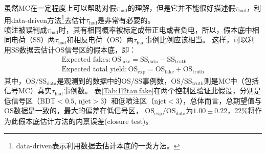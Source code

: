 虽然MC在一定程度上可以帮助对假$\tau_{\text{had}}$的理解，但是它并不能很好描述假$\tau_{\text{had}}$，利用data-driven方法\footnote{data-driven表示利用数据去估计本底的一类方法。}去估计$\tau_{\text{had}}$是非常有必要的。\\
喷注被误判成$\tau_{\text{had}}$时，其有相同概率被标定成带正电或者负电，所以，假本底中相同电荷（SS）两$\tau_{\text{had}}$和相反电荷（OS）两$\tau_{\text{had}}$事例比例应该相当。
这样，可以利用SS数据去估计OS信号区的假本底，即：
\begin{equation}
 \begin{aligned}
  \text{Expected fakes}: \text{OS}_{\text{fake}}=\text{SS}_{\text{data}}-\text{SS}_{\text{truth}}\\
  \text{Expected total yield}: \text{OS}_{\text{exp}}=\text{OS}_{\text{fake}}+\text{OS}_{\text{truth}}
 \end{aligned}
\end{equation}
其中，$\text{OS}/\text{SS}_{\text{data}}$是观测到的数据中的OS/SS事例数，$\text{OS}/\text{SS}_{\text{truth}}$则是MC中（包括信号MC）真实$\tau_{\text{had}}$事例数。
表\ref{Tab:1l2tau.fake}在两个控制区验证此假设，分别是低信号区（$\text{BDT}<0.5$, $\text{njet}>3$）和低喷注区（$\text{njet}<3$），总体而言，总期望值与OS数据是一致的，最大的偏差在低信号区，
$\text{OS}_{\text{exp}}/\text{OS}_{\text{data}}$为$1.00\pm 0.22$，22\%将作为此假本底估计方法的内禀误差(closure test)。

\begin{table}[htbp]
\small
\begin{center}
\caption{假$\tau_{\text{had}}$估计方法在低喷注数区和低信号区的closure test。}
\label{Tab:1l2tau.fake}
\end{center}
\end{table}

